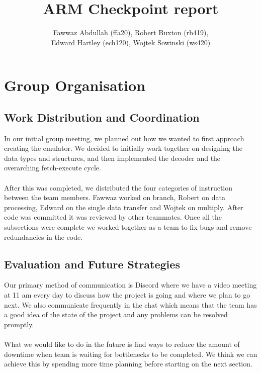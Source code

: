\documentclass[11pt]{article}
\begin{document}
\title{ARM Checkpoint report}
\author{Fawwaz Abdullah (ffa20), Robert Buxton (rb419), \\Edward Hartley (ech120), Wojtek Sowinski (ws420) }

\maketitle

\section{Group Organisation}

\subsection{Work Distribution and Coordination}

In our initial group meeting, we planned out how we wanted to first approach
creating the emulator. We decided to initially work together on designing the
data types and structures, and then implemented the decoder and the overarching
fetch-execute cycle. \\ \\
After this was completed, we distributed the four categories
of instruction between the team members. Fawwaz worked on branch, Robert on data
processing, Edward on the single data transfer and Wojtek on multiply. After
code was committed it was reviewed by other teammates. Once all the subsections were complete we worked together as a team to fix bugs
and remove redundancies in the code.

\subsection{Evaluation and Future Strategies}

Our primary method of communication is Discord where we have a video meeting at
11 am every day to discuss how the project is going and where we plan to go next.
We also communicate frequently in the chat which means that the team has a good
idea of the state of the project and any problems can be resolved promptly. \\ \\
What we would like to do in the future is find ways to reduce the amount of
downtime when team is waiting for bottlenecks to be completed. We think we can
achieve this by spending more time planning before starting on the next section.
\end{document}

